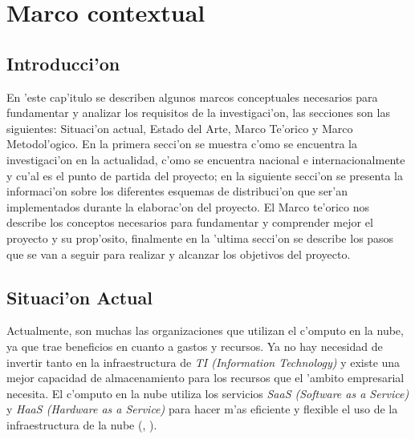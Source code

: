 
\chapter{Marco contextual}
\section*{Introducci'on}

En 'este cap'itulo se describen algunos marcos conceptuales necesarios para fundamentar y analizar los requisitos de la investigaci'on, las secciones son las siguientes: Situaci'on actual, Estado del Arte, Marco Te'orico y Marco Metodol'ogico. En la primera secci'on se muestra c'omo se encuentra la investigaci'on en la actualidad, c'omo se encuentra nacional e internacionalmente y cu'al es el punto de partida del proyecto; en la siguiente secci'on se presenta la informaci'on sobre los diferentes esquemas de distribuci'on que ser'an implementados durante la elaborac'on del proyecto. El Marco te'orico nos describe los conceptos necesarios para fundamentar y comprender mejor el proyecto y su prop'osito, finalmente en la 'ultima secci'on se describe los pasos que se van a seguir para realizar y alcanzar los objetivos del proyecto.

\newpage


\section{Situaci'on Actual}

Actualmente, son muchas las organizaciones que utilizan el c'omputo en la nube, ya que trae beneficios en cuanto a gastos y recursos. Ya no hay necesidad de invertir tanto en la infraestructura de \textit{TI (Information Technology)} y existe una mejor capacidad de almacenamiento para los recursos que el 'ambito empresarial necesita.
El c'omputo en la nube utiliza los servicios \textit{SaaS (Software as a Service)} y \textit{HaaS (Hardware as a Service)} para hacer m'as eficiente y flexible el uso de la infraestructura de la nube (\citeauthor{mariscal2013computo}, \citeyear{mariscal2013computo}). 

